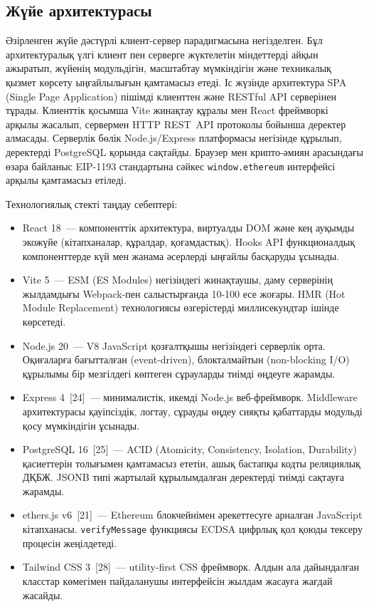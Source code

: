 \documentclass[14pt,a4paper]{extarticle}
\begin{document}
\subsection{Жүйе архитектурасы}

Әзірленген жүйе дәстүрлі клиент-сервер парадигмасына негізделген. Бұл архитектуралық үлгі клиент пен серверге жүктелетін міндеттерді айқын ажыратып, жүйенің модульдігін, масштабтау мүмкіндігін және техникалық қызмет көрсету ыңғайлылығын қамтамасыз етеді. Іс жүзінде архитектура SPA (Single Page Application) пішімді клиенттен және RESTful API серверінен тұрады. Клиенттік қосымша Vite жинақтау құралы мен React фреймворкі арқылы жасалып, сервермен HTTP REST~API протоколы бойынша деректер алмасады. Серверлік бөлік Node.js/Express платформасы негізінде құрылып, деректерді PostgreSQL қорында сақтайды. Браузер мен крипто-әмиян арасындағы өзара байланыс EIP-1193 стандартына сәйкес \texttt{window.ethereum} интерфейсі арқылы қамтамасыз етіледі.

Технологиялық стекті таңдау себептері:
\begin{itemize}[nosep]
\item React 18~--- компоненттік архитектура, виртуалды DOM және кең ауқымды экожүйе (кітапханалар, құралдар, қоғамдастық). Hooks API функционалдық компоненттерде күй мен жанама әсерлерді ыңғайлы басқаруды ұсынады.
\item Vite 5~--- ESM (ES Modules) негізіндегі жинақтаушы, даму серверінің жылдамдығы Webpack-пен салыстырғанда 10-100 есе жоғары. HMR (Hot Module Replacement) технологиясы өзгерістерді миллисекундтар ішінде көрсетеді.
\item Node.js 20~--- V8 JavaScript қозғалтқышы негізіндегі серверлік орта. Оқиғаларға бағытталған (event-driven), блокталмайтын (non-blocking I/O) құрылымы бір мезгілдегі көптеген сұрауларды тиімді өңдеуге жарамды.
\item Express 4~[24]~--- минималистік, икемді Node.js веб-фреймворк. Middleware архитектурасы қауіпсіздік, логтау, сұрауды өңдеу сияқты қабаттарды модульді қосу мүмкіндігін ұсынады.
\item PostgreSQL 16~[25]~--- ACID (Atomicity, Consistency, Isolation, Durability) қасиеттерін толығымен қамтамасыз ететін, ашық бастапқы кодты реляциялық ДҚБЖ. JSONB типі жартылай құрылымдалған деректерді тиімді сақтауға жарамды.
\item ethers.js v6~[21]~--- Ethereum блокчейнімен әрекеттесуге арналған JavaScript кітапханасы. \texttt{verifyMessage} функциясы ECDSA цифрлық қол қоюды тексеру процесін жеңілдетеді.
\item Tailwind CSS 3~[28]~--- utility-first CSS фреймворк. Алдын ала дайындалған класстар көмегімен пайдаланушы интерфейсін жылдам жасауға жағдай жасайды.
\end{itemize}
\end{document}
